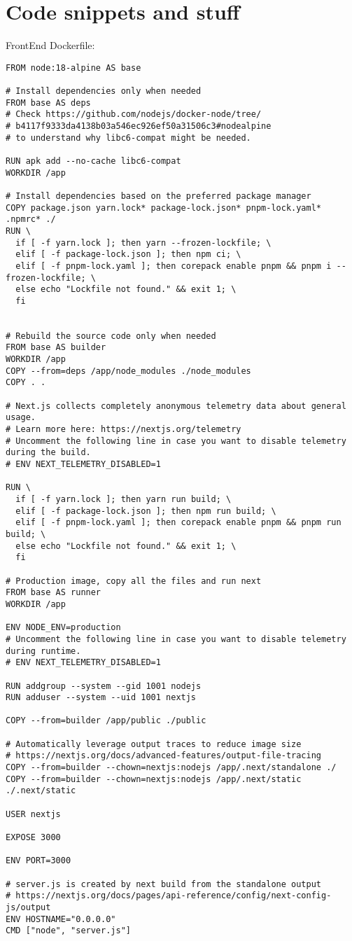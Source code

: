 \chapter{Code snippets and stuff}

FrontEnd Dockerfile:

\begin{verbatim}
FROM node:18-alpine AS base

# Install dependencies only when needed
FROM base AS deps
# Check https://github.com/nodejs/docker-node/tree/
# b4117f9333da4138b03a546ec926ef50a31506c3#nodealpine 
# to understand why libc6-compat might be needed.

RUN apk add --no-cache libc6-compat
WORKDIR /app

# Install dependencies based on the preferred package manager
COPY package.json yarn.lock* package-lock.json* pnpm-lock.yaml* .npmrc* ./
RUN \
  if [ -f yarn.lock ]; then yarn --frozen-lockfile; \
  elif [ -f package-lock.json ]; then npm ci; \
  elif [ -f pnpm-lock.yaml ]; then corepack enable pnpm && pnpm i --frozen-lockfile; \
  else echo "Lockfile not found." && exit 1; \
  fi


# Rebuild the source code only when needed
FROM base AS builder
WORKDIR /app
COPY --from=deps /app/node_modules ./node_modules
COPY . .

# Next.js collects completely anonymous telemetry data about general usage.
# Learn more here: https://nextjs.org/telemetry
# Uncomment the following line in case you want to disable telemetry during the build.
# ENV NEXT_TELEMETRY_DISABLED=1

RUN \
  if [ -f yarn.lock ]; then yarn run build; \
  elif [ -f package-lock.json ]; then npm run build; \
  elif [ -f pnpm-lock.yaml ]; then corepack enable pnpm && pnpm run build; \
  else echo "Lockfile not found." && exit 1; \
  fi

# Production image, copy all the files and run next
FROM base AS runner
WORKDIR /app

ENV NODE_ENV=production
# Uncomment the following line in case you want to disable telemetry during runtime.
# ENV NEXT_TELEMETRY_DISABLED=1

RUN addgroup --system --gid 1001 nodejs
RUN adduser --system --uid 1001 nextjs

COPY --from=builder /app/public ./public

# Automatically leverage output traces to reduce image size
# https://nextjs.org/docs/advanced-features/output-file-tracing
COPY --from=builder --chown=nextjs:nodejs /app/.next/standalone ./
COPY --from=builder --chown=nextjs:nodejs /app/.next/static ./.next/static

USER nextjs

EXPOSE 3000

ENV PORT=3000

# server.js is created by next build from the standalone output
# https://nextjs.org/docs/pages/api-reference/config/next-config-js/output
ENV HOSTNAME="0.0.0.0"
CMD ["node", "server.js"]
\end{verbatim}